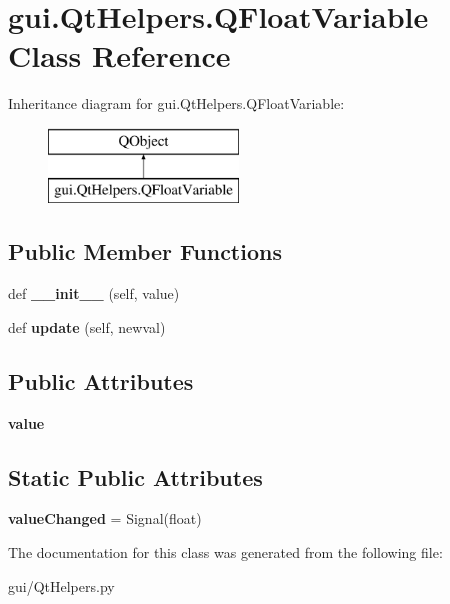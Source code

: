 \hypertarget{classgui_1_1_qt_helpers_1_1_q_float_variable}{}\section{gui.\+Qt\+Helpers.\+Q\+Float\+Variable Class Reference}
\label{classgui_1_1_qt_helpers_1_1_q_float_variable}
Inheritance diagram for gui.\+Qt\+Helpers.\+Q\+Float\+Variable\+:\begin{figure}[H]
\begin{center}
\leavevmode
\includegraphics[height=2.000000cm]{dc/dfb/classgui_1_1_qt_helpers_1_1_q_float_variable}
\end{center}
\end{figure}
\subsection*{Public Member Functions}
\begin{DoxyCompactItemize}
\item 
\mbox{\label{classgui_1_1_qt_helpers_1_1_q_float_variable_a5a0831cd29f7e54efee04bf2096825a7}} 
def {\bfseries \+\_\+\+\_\+init\+\_\+\+\_\+} (self, value)
\item 
\mbox{\label{classgui_1_1_qt_helpers_1_1_q_float_variable_a27a9404199f202d96c957e519ed8632b}} 
def {\bfseries update} (self, newval)
\end{DoxyCompactItemize}
\subsection*{Public Attributes}
\begin{DoxyCompactItemize}
\item 
\mbox{\label{classgui_1_1_qt_helpers_1_1_q_float_variable_af57614ec8ba179d5668a5b5cd70fe0bf}} 
{\bfseries value}
\end{DoxyCompactItemize}
\subsection*{Static Public Attributes}
\begin{DoxyCompactItemize}
\item 
\mbox{\label{classgui_1_1_qt_helpers_1_1_q_float_variable_a3a3c6d381c9c9e00688e8c4b90384c9e}} 
{\bfseries value\+Changed} = Signal(float)
\end{DoxyCompactItemize}


The documentation for this class was generated from the following file\+:\begin{DoxyCompactItemize}
\item 
gui/Qt\+Helpers.\+py\end{DoxyCompactItemize}
